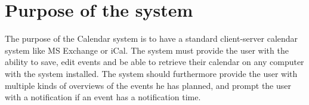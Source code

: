 \section{Purpose of the system}
The purpose of the Calendar system is to have a standard client-server calendar system like MS Exchange or iCal. The system must provide the user with the ability to save, edit events and be able to retrieve their calendar on any computer with the system installed. The system should furthermore provide the user with multiple kinds of overviews of the events he has planned, and prompt the user with a notification if an event has a notification time.\\